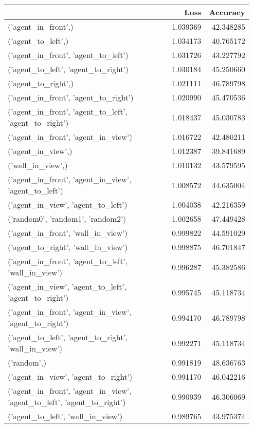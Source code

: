 \begin{tabular}{lrr}
\toprule
 & Loss & Accuracy \\
\midrule
('agent\_in\_front',) & 1.039369 & 42.348285 \\
('agent\_to\_left',) & 1.034173 & 40.765172 \\
('agent\_in\_front', 'agent\_to\_left') & 1.031726 & 43.227792 \\
('agent\_to\_left', 'agent\_to\_right') & 1.030184 & 45.250660 \\
('agent\_to\_right',) & 1.021111 & 46.789798 \\
('agent\_in\_front', 'agent\_to\_right') & 1.020990 & 45.470536 \\
('agent\_in\_front', 'agent\_to\_left', 'agent\_to\_right') & 1.018437 & 45.030783 \\
('agent\_in\_front', 'agent\_in\_view') & 1.016722 & 42.480211 \\
('agent\_in\_view',) & 1.012387 & 39.841689 \\
('wall\_in\_view',) & 1.010132 & 43.579595 \\
('agent\_in\_front', 'agent\_in\_view', 'agent\_to\_left') & 1.008572 & 44.635004 \\
('agent\_in\_view', 'agent\_to\_left') & 1.004038 & 42.216359 \\
('random0', 'random1', 'random2') & 1.002658 & 47.449428 \\
('agent\_in\_front', 'wall\_in\_view') & 0.999822 & 44.591029 \\
('agent\_to\_right', 'wall\_in\_view') & 0.998875 & 46.701847 \\
('agent\_in\_front', 'agent\_to\_left', 'wall\_in\_view') & 0.996287 & 45.382586 \\
('agent\_in\_view', 'agent\_to\_left', 'agent\_to\_right') & 0.995745 & 45.118734 \\
('agent\_in\_front', 'agent\_in\_view', 'agent\_to\_right') & 0.994170 & 46.789798 \\
('agent\_to\_left', 'agent\_to\_right', 'wall\_in\_view') & 0.992271 & 45.118734 \\
('random',) & 0.991819 & 48.636763 \\
('agent\_in\_view', 'agent\_to\_right') & 0.991170 & 46.042216 \\
('agent\_in\_front', 'agent\_in\_view', 'agent\_to\_left', 'agent\_to\_right') & 0.990939 & 46.306069 \\
('agent\_to\_left', 'wall\_in\_view') & 0.989765 & 43.975374 \\

\end{tabular}
